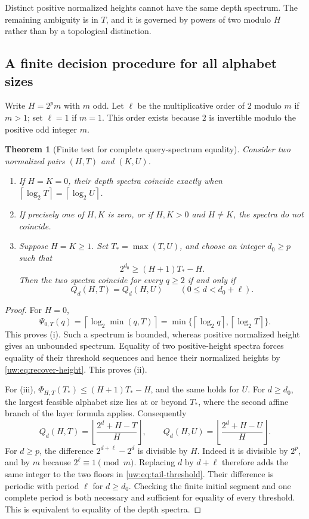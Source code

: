 \documentclass[11pt,letterpaper]{article}
\numberwithin{equation}{section}
\newtheorem{theorem}{Theorem}[section]
\theoremstyle{definition}
\theoremstyle{remark}
\theoremstyle{definition}
\newcommand{\ceil}[1]{\left\lceil#1\right\rceil}
\newcommand{\floor}[1]{\left\lfloor #1\right\rfloor}
\begin{document}
Distinct positive normalized heights cannot have the same depth spectrum.
The remaining ambiguity is in $T$, and it is governed by powers of two modulo
$H$ rather than by a topological distinction.

\subsection{A finite decision procedure for all alphabet sizes}
Write $H=2^p m$ with $m$ odd. Let $\ell$ be the multiplicative order of $2$
modulo $m$ if $m>1$; set $\ell=1$ if $m=1$. This order exists because $2$
is invertible modulo the positive odd integer $m$.

\begin{theorem}[Finite test for complete query-spectrum equality]
\label{uw:thm:depth-equality}
Consider two normalized pairs $(H,T)$ and $(K,U)$.
\begin{enumerate}[label=\textup{(\roman*)}]
\item If $H=K=0$, their depth spectra coincide exactly when
$\ceil{\log_2T}=\ceil{\log_2U}$.
\item If precisely one of $H,K$ is zero, or if $H,K>0$ and $H\ne K$,
the spectra do not coincide.
\item Suppose $H=K\ge1$. Set $T_* =\max(T,U)$, and choose an integer
$d_0\ge p$ such that
\begin{equation}\label{uw:eq:d0}
 2^{d_0}\ge (H+1)T_*-H.
\end{equation}
Then the two spectra coincide for every $q\ge2$ if and only if
\begin{equation}\label{uw:eq:finite-test}
 Q_d(H,T)=Q_d(H,U)\qquad(0\le d<d_0+\ell).
\end{equation}
\end{enumerate}
\end{theorem}
\begin{proof}
For $H=0$,
\[
 \Psi_{0,T}(q)=\ceil{\log_2\min(q,T)}
 =\min\{\ceil{\log_2q},\ceil{\log_2T}\}.
\]
This proves (i). Such a spectrum is bounded, whereas positive normalized
height gives an unbounded spectrum. Equality of two positive-height spectra
forces equality of their threshold sequences and hence their normalized
heights by \eqref{uw:eq:recover-height}. This proves (ii).

For (iii), $\Phi_{H,T}(T_*)\le(H+1)T_*-H$, and the same holds for $U$.
For $d\ge d_0$, the largest feasible alphabet size lies at or beyond $T_*$,
where the second affine branch of the layer formula applies. Consequently
\begin{equation}\label{uw:eq:tail-threshold}
 Q_d(H,T)=\floor{\frac{2^d+H-T}{H}},\qquad
 Q_d(H,U)=\floor{\frac{2^d+H-U}{H}}.
\end{equation}
For $d\ge p$, the difference $2^{d+\ell}-2^d$ is divisible by $H$.
Indeed it is divisible by $2^p$, and by $m$ because $2^\ell\equiv1\pmod m$.
Replacing $d$ by $d+\ell$ therefore adds the same integer to the two floors
in \eqref{uw:eq:tail-threshold}. Their difference is periodic with period
$\ell$ for $d\ge d_0$. Checking the finite initial segment and one complete
period is both necessary and sufficient for equality of every threshold.
This is equivalent to equality of the depth spectra.
\end{proof}
\end{document}
